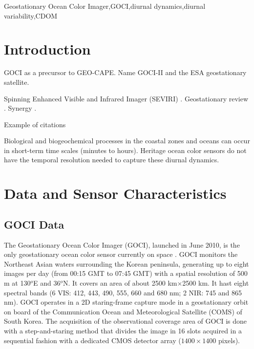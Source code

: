 \documentclass[onecolumn,3p,letterpaper,11pt]{elsarticle}
\begin{document}
\begin{frontmatter}
\begin{abstract}
%
 
%


%

\end{abstract}

\begin{keyword}
Geostationary Ocean Color Imager\sep GOCI\sep diurnal dynamics\sep diurnal variability\sep CDOM
\end{keyword}

\end{frontmatter}
\section{Introduction}
GOCI as a precursor to GEO-CAPE. 
Name GOCI-II and the ESA geostationary satellite.

Spinning Enhanced Visible and Infrared Imager (SEVIRI) \citet{Neukermans2009,Neukermans2012}. Geostationary review \citet{Ruddick2014}. Synergy \citet{Vanhellemont2014}.

Example of citations \citet{Ryu2011,He2013,Hu2016}

Biological and biogeochemical processes in the coastal zones and oceans can occur in short-term time scales (minutes to hours). Heritage ocean color sensors do not have the temporal resolution needed to capture these diurnal dynamics.
\section{Data and Sensor Characteristics}
\subsection{GOCI Data}
The Geostationary Ocean Color Imager (GOCI), launched in June 2010, is the only geostationary ocean color sensor currently on space \citep{Ryu2012}. GOCI monitors the Northeast Asian waters surrounding the Korean peninsula, generating up to eight images per day (from 00:15 GMT to 07:45 GMT) with a spatial resolution of 500 m at 130$^o$E and 36$^o$N. It covers an area of about 2500 km$\times$2500 km. It hast eight spectral bands (6 VIS: 412, 443, 490, 555, 660 and 680 nm; 2 NIR: 745 and 865 nm). GOCI operates in a 2D staring-frame capture mode in a geostationary orbit on board of the Communication Ocean and Meteorological Satellite (COMS) of South Korea. The acquisition of the observational coverage area of GOCI is done with a step-and-staring method that divides the image in 16 slots acquired in a sequential fashion with a dedicated CMOS detector array ($1400\times1400$ pixels).
\end{document}
